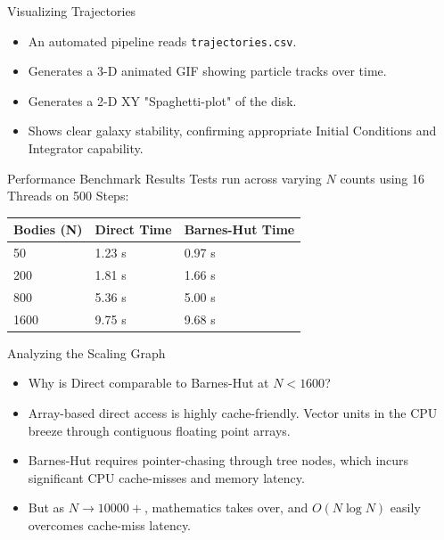 \documentclass[aspectratio=169]{beamer}
\begin{document}
\begin{frame}{Visualizing Trajectories}
    \begin{itemize}
        \item An automated pipeline reads \texttt{trajectories.csv}.
        \item Generates a 3-D animated GIF showing particle tracks over time.
        \item Generates a 2-D XY "Spaghetti-plot" of the disk.
        \item Shows clear galaxy stability, confirming appropriate Initial Conditions and Integrator capability.
    \end{itemize}
\end{frame}

\begin{frame}{Performance Benchmark Results}
    Tests run across varying $N$ counts using 16 Threads on 500 Steps:
    \begin{table}[]
        \centering
        \begin{tabular}{|l|l|l|}
        \hline
        \textbf{Bodies (N)} & \textbf{Direct Time} & \textbf{Barnes-Hut Time} \\ \hline
        50                  & 1.23 s               & 0.97 s                   \\ \hline
        200                 & 1.81 s               & 1.66 s                   \\ \hline
        800                 & 5.36 s               & 5.00 s                   \\ \hline
        1600                & 9.75 s               & 9.68 s                   \\ \hline
        \end{tabular}
    \end{table}
\end{frame}

\begin{frame}{Analyzing the Scaling Graph}
    \begin{itemize}
        \item Why is Direct comparable to Barnes-Hut at $N < 1600$?
        \item Array-based direct access is highly cache-friendly. Vector units in the CPU breeze through contiguous floating point arrays.
        \item Barnes-Hut requires pointer-chasing through tree nodes, which incurs significant CPU cache-misses and memory latency.
        \item But as $N \to 10000+$, mathematics takes over, and $O(N \log N)$ easily overcomes cache-miss latency.
    \end{itemize}
\end{frame}
\end{document}
